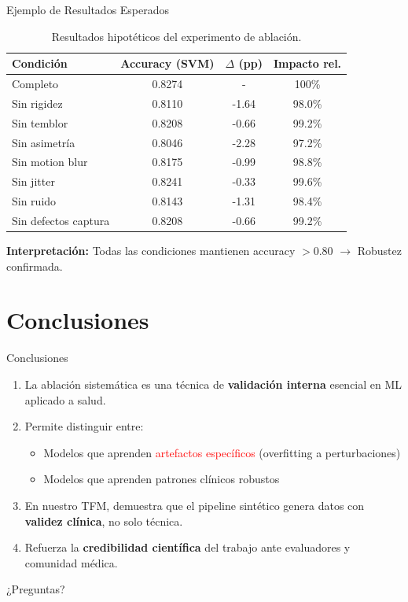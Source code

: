 \documentclass[aspectratio=169]{beamer}
\begin{document}
\begin{frame}{Ejemplo de Resultados Esperados}
\begin{table}
\centering
\small
\begin{tabular}{lccc}
\toprule
\textbf{Condición} & \textbf{Accuracy (SVM)} & \textbf{$\Delta$ (pp)} & \textbf{Impacto rel.} \\
\midrule
Completo & 0.8274 & - & 100\% \\
Sin rigidez & 0.8110 & -1.64 & 98.0\% \\
Sin temblor & 0.8208 & -0.66 & 99.2\% \\
Sin asimetría & 0.8046 & -2.28 & 97.2\% \\
Sin motion blur & 0.8175 & -0.99 & 98.8\% \\
Sin jitter & 0.8241 & -0.33 & 99.6\% \\
Sin ruido & 0.8143 & -1.31 & 98.4\% \\
Sin defectos captura & 0.8208 & -0.66 & 99.2\% \\
\bottomrule
\end{tabular}
\caption{Resultados hipotéticos del experimento de ablación.}
\end{table}

\vspace{0.3cm}
\textbf{Interpretación:} Todas las condiciones mantienen accuracy $> 0.80$ $\rightarrow$ Robustez confirmada.
\end{frame}

\section{Conclusiones}

\begin{frame}{Conclusiones}
\begin{enumerate}
\item La ablación sistemática es una técnica de \textbf{validación interna} esencial en ML aplicado a salud.

\vspace{0.3cm}

\item Permite distinguir entre:
\begin{itemize}
\item Modelos que aprenden \textcolor{red}{artefactos específicos} (overfitting a perturbaciones)
\item Modelos que aprenden \textcolor{green!70!black}{patrones clínicos robustos}
\end{itemize}

\vspace{0.3cm}

\item En nuestro TFM, demuestra que el pipeline sintético genera datos con \textbf{validez clínica}, no solo técnica.

\vspace{0.3cm}

\item Refuerza la \textbf{credibilidad científica} del trabajo ante evaluadores y comunidad médica.
\end{enumerate}
\end{frame}

\begin{frame}
\begin{center}
\Huge ¿Preguntas?
\end{center}
\end{frame}
\end{document}
